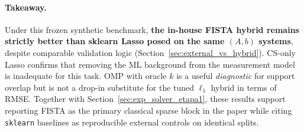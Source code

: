 \paragraph{Takeaway.}
Under this frozen synthetic benchmark, \textbf{the in-house FISTA hybrid remains strictly better than sklearn Lasso posed on the same $(A,b)$ systems}, despite comparable validation logic (Section~\ref{sec:external_vs_hybrid}).
CS-only Lasso confirms that removing the ML background from the measurement model is inadequate for this task.
OMP with oracle $k$ is a useful \emph{diagnostic} for support overlap but is not a drop-in substitute for the tuned $\ell_1$ hybrid in terms of RMSE.
Together with Section~\ref{sec:exp_solver_etapa1}, these results support reporting FISTA as the primary classical sparse block in the paper while citing \texttt{sklearn} baselines as reproducible external controls on identical splits.
